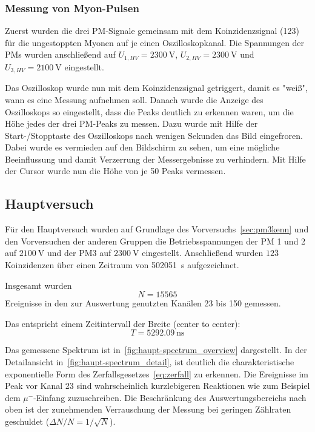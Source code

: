 \documentclass[slug=LM, room=Andreas-Schubert-Bau\,\ K\ 1A, supervisor=Anne-Sophie\ Berthold, coursedate=13.\ 12.\ 2019]{../../Lab_Report_LaTeX/lab_report}
\begin{document}
\subsubsection{Messung von Myon-Pulsen}
\label{sec:pulse}

Zuerst wurden die drei PM-Signale gemeinsam mit dem Koinzidenzsignal
(123) für die ungestoppten Myonen auf je einen Oszilloskopkanal. Die
Spannungen der PMs wurden anschließend auf
\(U_{1,HV} = \SI{2300}{\volt}\), \(U_{2,HV} = \SI{2300}{\volt}\) und
\(U_{3,HV} = \SI{2100}{\volt}\) eingestellt.

Das Oszilloskop wurde nun mit dem Koinzidenzsignal getriggert, damit
es "weiß", wann es eine Messung aufnehmen soll.  Danach wurde die
Anzeige des Oszilloskops so eingestellt, dass die Peaks deutlich zu
erkennen waren, um die Höhe jedes der drei PM-Peaks zu messen. Dazu
wurde mit Hilfe der Start-/Stopptaste des Oszilloskops nach wenigen
Sekunden das Bild eingefroren. Dabei wurde es vermieden auf den
Bildschirm zu sehen, um eine mögliche Beeinflussung und damit
Verzerrung der Messergebnisse zu verhindern. Mit Hilfe der Cursor wurde
nun die Höhe von je 50 Peaks vermessen.

\subsection{Hauptversuch}
\label{sec:hauptversuch}

F\"ur den Hauptversuch wurden auf Grundlage des
Vorversuchs~\ref{sec:pm3kenn} und den Vorversuchen der anderen Gruppen
die Betriebsspannungen der PM 1 und 2 auf \(\SI{2100}{\volt}\) und der
PM3 auf \(\SI{2300}{\volt}\) eingestellt. Anschließend wurden
\(\textit{12}\bar{\textit{3}}\) Koinzidenzen \"uber einen Zeitraum von
\SI{502051}{\second} aufgezeichnet.

Insgesamt wurden
\begin{equation}
  \label{eq:totalcount}
  N=15565
\end{equation}
Ereignisse in den zur Auswertung genutzten Kan\"alen 23 bis 150
gemessen.

Das entspricht einem Zeitintervall der Breite (center to center):
\begin{equation}
  \label{eq:totalwidth}
  T = \SI{5292.09}{\nano\second}
\end{equation}

Das gemessene Spektrum ist
in~\ref{fig:haupt-spectrum_overview} dargestellt. In der
Detailansicht in~\ref{fig:haupt-spectrum_detail}, ist deutlich die
charakteristische exponentielle Form des
Zerfallsgesetzes~\ref{eq:zerfall} zu erkennen.
Die Ereignisse im Peak vor Kanal 23 sind wahrscheinlich kurzlebigeren
Reaktionen wie zum Beispiel dem \(\mu^{-}\)-Einfang zuzuschreiben. Die
Beschr\"ankung des Auswertungsbereichs nach oben ist der zunehmenden
Verrauschung der Messung bei geringen Z\"ahlraten geschuldet (\(\Delta
N/N=1/\sqrt{N}\)).
\end{document}

